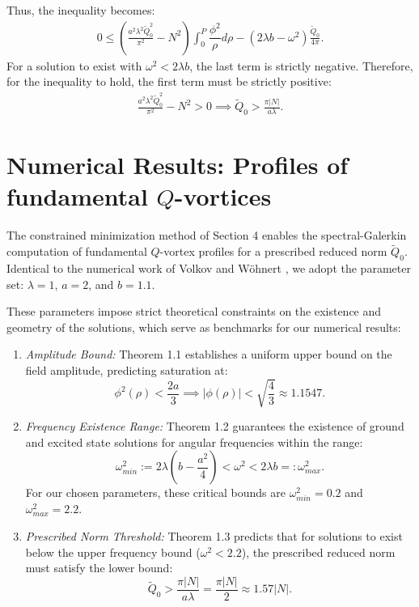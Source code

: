 \documentclass[12pt]{article}
\begin{document}
	Thus, the inequality becomes:
	\begin{align}
		0 \leq \left(\frac{a^2\lambda^2 \tilde{Q}_0^2}{\pi^2} - N^2\right) \int_0^{P}\dfrac{\phi^2}{\rho}d\rho - (2\lambda b-\omega^2) \frac{\tilde{Q}_0}{4\pi}.
	\end{align}
	For a solution to exist with $\omega^2 < 2\lambda b$, the last term is strictly negative. Therefore, for the inequality to hold, the first term must be strictly positive:
	\begin{align}
		\frac{a^2\lambda^2 \tilde{Q}_0^2}{\pi^2} - N^2 > 0 \implies \tilde{Q}_0 > \frac{\pi |N|}{a\lambda}.
	\end{align}
	
	
\section{Numerical Results: Profiles of fundamental $Q$-vortices}
\setcounter{equation}{0}
The constrained minimization method of Section 4 enables the spectral-Galerkin computation of fundamental $Q$-vortex profiles for a prescribed reduced norm $\tilde{Q}_0$. Identical to the numerical work of Volkov and W\"ohnert \cite{VW}, we adopt the parameter set: $\lambda=1$, $a=2$, and $b=1.1$.

These parameters impose strict theoretical constraints on the existence and geometry of the solutions, which serve as benchmarks for our numerical results:
\begin{enumerate}
    \item \textit{Amplitude Bound:} Theorem 1.1 establishes a uniform upper bound on the field amplitude, predicting saturation at:
    \begin{equation}
        \phi^2(\rho) < \frac{2a}{3} \implies |\phi(\rho)| < \sqrt{\frac{4}{3}} \approx 1.1547.
    \end{equation}
    \item \textit{Frequency Existence Range:} Theorem 1.2 guarantees the existence of ground and excited state solutions for angular frequencies within the range:
    \begin{equation}
        \omega_{min}^2 := 2\lambda\left(b-\frac{a^2}{4}\right) < \omega^2 < 2\lambda b =: \omega_{max}^2.
    \end{equation}
    For our chosen parameters, these critical bounds are $\omega_{min}^2 = 0.2$ and $\omega_{max}^2 = 2.2$.
    \item \textit{Prescribed Norm Threshold:} Theorem 1.3 predicts that for solutions to exist below the upper frequency bound ($\omega^2 < 2.2$), the prescribed reduced norm must satisfy the lower bound:
    \begin{equation}
        \tilde{Q}_0 > \frac{\pi |N|}{a\lambda} = \frac{\pi |N|}{2} \approx 1.57 |N|.
    \end{equation}
\end{enumerate}
\end{document}
